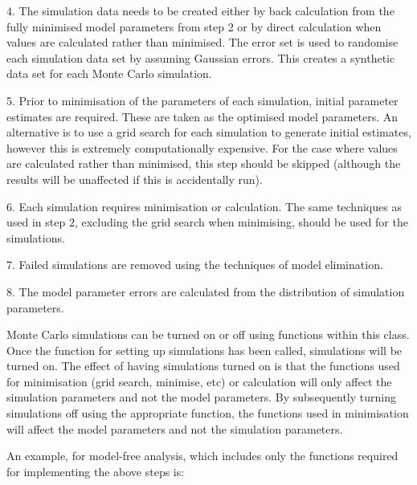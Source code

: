 4.  The simulation data needs to be created either by back calculation from the fully
minimised  model parameters from step 2 or by direct calculation when values are calculated
rather than minimised.   The error set is used to randomise each simulation data set by
assuming Gaussian errors.  This creates a synthetic data set for each Monte Carlo
simulation.

5.  Prior to minimisation  of the parameters of each simulation, initial parameter estimates
are required.  These are taken as the optimised  model parameters.  An alternative is to use
a grid search for each simulation to generate initial estimates, however this is extremely
computationally expensive.  For the case where values are calculated rather than minimised, 
this step should be skipped (although the results will be unaffected if this is accidentally
run).

6.  Each simulation requires minimisation  or calculation.  The same techniques as used in
step 2, excluding the grid search when minimising, should be used for the simulations.

7.  Failed simulations are removed using the techniques of model elimination.  

8.  The model parameter errors are calculated from the distribution of simulation
parameters.


Monte Carlo simulations can be turned on or off using functions within this class.  Once the
function for setting up simulations has been called, simulations will be turned on.  The
effect of having simulations turned on is that the functions used for minimisation  (grid
search, minimise,  etc) or calculation will only affect the simulation parameters and not the
model parameters.  By subsequently turning simulations off using the appropriate function,
the functions used in minimisation  will affect the model parameters and not the simulation
parameters.


An example, for model-free analysis, which includes only the functions required for
implementing the above steps is:



